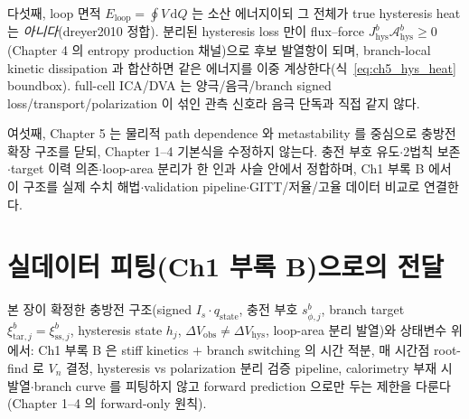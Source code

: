 \documentclass[11pt,a4paper]{article}
\newcommand{\dd}{\mathrm{d}}
\newcommand{\hys}{\mathrm{hys}}
\newcommand{\obs}{\mathrm{obs}}
\newcommand{\tar}{\mathrm{tar}}
\newcommand{\stt}{\mathrm{state}}
\newcommand{\sstat}{\mathrm{ss}}
\begin{document}
다섯째, loop 면적 $E_{\mathrm{loop}}=\oint V\,\dd Q$ 는 소산 에너지이되 그 전체가 true hysteresis heat 는
\emph{아니다}(dreyer2010 정합). 분리된 hysteresis loss 만이 flux--force $J_\hys^b\mathcal A_\hys^b\ge0$
(Chapter 4 의 entropy production 채널)으로 후보 발열항이 되며, branch-local kinetic dissipation 과 합산하면
같은 에너지를 이중 계상한다(식~\eqref{eq:ch5_hys_heat} boundbox). full-cell ICA/DVA 는 양극/음극/branch signed
loss/transport/polarization 이 섞인 관측 신호라 음극 단독과 직접 같지 않다.

여섯째, Chapter 5 는 물리적 path dependence 와 metastability 를 중심으로 충방전 확장 구조를 닫되, Chapter 1--4
기본식을 수정하지 않는다. 충전 부호 유도$\cdot$2법칙 보존$\cdot$target 이력 의존$\cdot$loop-area 분리가 한 인과
사슬 안에서 정합하며, Ch1 부록 B 에서 이 구조를 실제 수치 해법$\cdot$validation pipeline$\cdot$GITT/저율/고율
데이터 비교로 연결한다.

\section*{실데이터 피팅(Ch1 부록 B)으로의 전달}
본 장이 확정한 충방전 구조(signed $I_s\cdot q_\stt$, 충전 부호 $s_{\phi,j}^b$, branch target $\xi_{\tar,j}^b
=\xi_{\sstat,j}^b$, hysteresis state $h_j$, $\Delta V_\obs\ne\Delta V_\hys$, loop-area 분리 발열)와 상태변수
위에서: Ch1 부록 B 은 stiff kinetics $+$ branch switching 의 시간 적분, 매 시간점 root-find 로 $V_n$ 결정,
hysteresis vs polarization 분리 검증 pipeline, calorimetry 부재 시 발열$\cdot$branch curve 를 피팅하지 않고
forward prediction 으로만 두는 제한을 다룬다(Chapter 1--4 의 forward-only 원칙).
\end{document}
